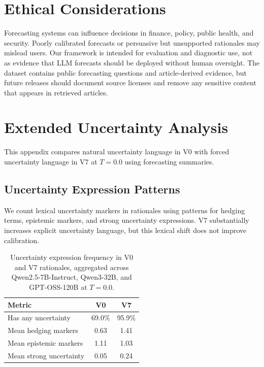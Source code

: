 \documentclass[11pt]{article}
\begin{document}
\section{Ethical Considerations}

Forecasting systems can influence decisions in finance, policy, public health, and security.
Poorly calibrated forecasts or persuasive but unsupported rationales may mislead users.
Our framework is intended for evaluation and diagnostic use, not as evidence that LLM forecasts should be deployed without human oversight.
The dataset contains public forecasting questions and article-derived evidence, but future releases should document source licenses and remove any sensitive content that appears in retrieved articles.

\section{Extended Uncertainty Analysis}
\label{app:uncertainty}

This appendix compares natural uncertainty language in V0 with forced uncertainty language in V7 at $T=0.0$ using forecasting summaries.

\subsection{Uncertainty Expression Patterns}

We count lexical uncertainty markers in rationales using patterns for hedging terms, epistemic markers, and strong uncertainty expressions.
V7 substantially increases explicit uncertainty language, but this lexical shift does not improve calibration.

\begin{table}[h]
\centering
\small
\begin{tabular}{lcc}
\toprule
\textbf{Metric} & \textbf{V0} & \textbf{V7} \\
\midrule
Has any uncertainty & 69.0\% & 95.9\% \\
Mean hedging markers & 0.63 & 1.41 \\
Mean epistemic markers & 1.11 & 1.03 \\
Mean strong uncertainty & 0.05 & 0.24 \\
\bottomrule
\end{tabular}
\caption{Uncertainty expression frequency in V0 and V7 rationales, aggregated across Qwen2.5-7B-Instruct, Qwen3-32B, and GPT-OSS-120B at $T=0.0$.}
\label{tab:uncertainty-freq}
\end{table}
\end{document}
